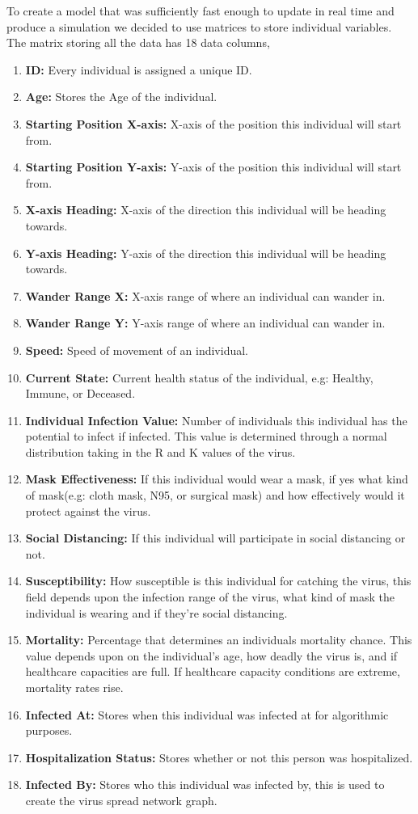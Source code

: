 \documentclass[11pt]{article}
\begin{document}
To create a model that was sufficiently fast enough to update in real time and produce a simulation we decided to use matrices to store individual variables. The matrix storing all the data has 18 data columns,
\begin{enumerate}
    \item \textbf{ID:} Every individual is assigned a unique ID.
    \item \textbf{Age:} Stores the Age of the individual.
    \item \textbf{Starting Position X-axis:} X-axis of the position this individual will start from.
    \item \textbf{Starting Position Y-axis:} Y-axis of the position this individual will start from.
    \item \textbf{X-axis Heading:} X-axis of the direction this individual will be heading towards.
    \item \textbf{Y-axis Heading:} Y-axis of the direction this individual will be heading towards.
    \item \textbf{Wander Range X:} X-axis range of where an individual can wander in.
    \item \textbf{Wander Range Y:} Y-axis range of where an individual can wander in.
    \item \textbf{Speed:} Speed of movement of an individual.
    \item \textbf{Current State:} Current health status of the individual, e.g: Healthy, Immune, or Deceased.
    \item \textbf{Individual Infection Value:} Number of individuals this individual has the potential to infect if infected. This value is determined through a normal distribution taking in the R and K values of the virus.
    \item \textbf{Mask Effectiveness:} If this individual would wear a mask, if yes what kind of mask(e.g: cloth mask, N95, or surgical mask) and how effectively would it protect against the virus.
    \item \textbf{Social Distancing:} If this individual will participate in social distancing or not.
    \item \textbf{Susceptibility:} How susceptible is this individual for catching the virus, this field depends upon the infection range of the virus, what kind of mask the individual is wearing and if they're social distancing.
    \item \textbf{Mortality:} Percentage that determines an individuals mortality chance. This value depends upon on the individual's age, how deadly the virus is, and if healthcare capacities are full. If healthcare capacity conditions are extreme, mortality rates rise.
    \item \textbf{Infected At:} Stores when this individual was infected at for algorithmic purposes.
    \item \textbf{Hospitalization Status:} Stores whether or not this person was hospitalized.
    \item \textbf{Infected By:} Stores who this individual was infected by, this is used to create the virus spread network graph.
\end{enumerate}
\end{document}
